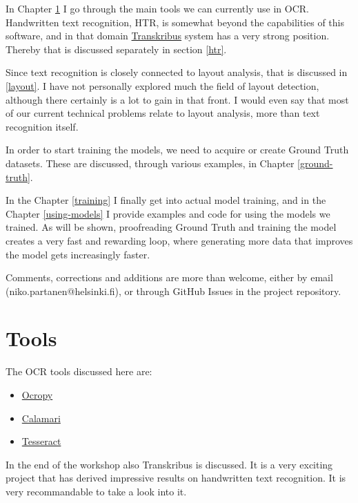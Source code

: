 \documentclass[]{book}
\providecommand{\tightlist}{%
  \setlength{\itemsep}{0pt}\setlength{\parskip}{0pt}}
\begin{document}
In Chapter \ref{tools} I go through the main tools we can currently use in OCR. Handwritten text recognition, HTR, is somewhat beyond the capabilities of this software, and in that domain \href{https://transkribus.eu/Transkribus/}{Transkribus} system has a very strong position. Thereby that is discussed separately in section \ref{htr}.

Since text recognition is closely connected to layout analysis, that is discussed in \ref{layout}. I have not personally explored much the field of layout detection, although there certainly is a lot to gain in that front. I would even say that most of our current technical problems relate to layout analysis, more than text recognition itself.

In order to start training the models, we need to acquire or create Ground Truth datasets. These are discussed, through various examples, in Chapter \ref{ground-truth}.

In the Chapter \ref{training} I finally get into actual model training, and in the Chapter \ref{using-models} I provide examples and code for using the models we trained. As will be shown, proofreading Ground Truth and training the model creates a very fast and rewarding loop, where generating more data that improves the model gets increasingly faster.

Comments, corrections and additions are more than welcome, either by email (niko.partanen@helsinki.fi), or through GitHub Issues in the project repository.

\hypertarget{tools}{%
\chapter{Tools}\label{tools}}

The OCR tools discussed here are:

\begin{itemize}
\tightlist
\item
  \href{https://github.com/tmbdev/ocropy}{Ocropy}
\item
  \href{https://github.com/Calamari-OCR/calamari}{Calamari}
\item
  \href{https://github.com/tesseract-ocr/tesseract}{Tesseract}
\end{itemize}

In the end of the workshop also Transkribus is discussed. It is a very exciting project that has derived impressive results on handwritten text recognition. It is very recommandable to take a look into it.
\end{document}
